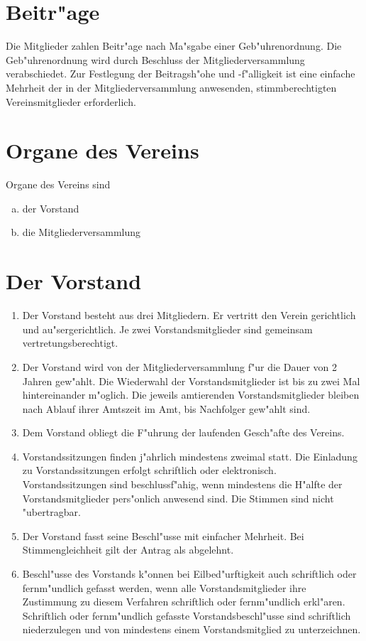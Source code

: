 \documentclass[a5paper, ngerman, 10pt]{scrreprt}
\begin{document}
\section{Beitr"age}
Die Mitglieder zahlen Beitr"age nach Ma"sgabe einer Geb"uhrenordnung. Die
Geb"uhrenordnung wird durch Beschluss der Mitgliederversammlung verabschiedet.
Zur Festlegung der Beitragsh"ohe und -f"alligkeit ist eine einfache Mehrheit der
in der Mitgliederversammlung anwesenden, stimmberechtigten Vereinsmitglieder
erforderlich.


\section{Organe des Vereins}
Organe des Vereins sind
\begin{enumerate}[a.]
    \item der Vorstand
    \item die Mitgliederversammlung
\end{enumerate}


\section{Der Vorstand}
\begin{enumerate}[(1)]
    \item Der Vorstand besteht aus drei Mitgliedern. Er vertritt den Verein
        gerichtlich und au"sergerichtlich. Je zwei Vorstandsmitglieder sind
        gemeinsam vertretungsberechtigt.
    \item Der Vorstand wird von der Mitgliederversammlung f"ur die Dauer von 2
        Jahren gew"ahlt. Die Wiederwahl der Vorstandsmitglieder ist bis zu zwei
        Mal hintereinander m"oglich. Die jeweils amtierenden Vorstandsmitglieder
        bleiben nach Ablauf ihrer Amtszeit im Amt, bis Nachfolger gew"ahlt sind.
    \item Dem Vorstand obliegt die F"uhrung der laufenden Gesch"afte des
        Vereins.
    \item Vorstandssitzungen finden j"ahrlich mindestens zweimal statt. Die
        Einladung zu Vorstandssitzungen erfolgt schriftlich oder elektronisch.
        Vorstandssitzungen sind beschlussf"ahig, wenn mindestens die H"alfte der
        Vorstandsmitglieder pers"onlich anwesend sind. Die Stimmen sind nicht
        "ubertragbar.
    \item Der Vorstand fasst seine Beschl"usse mit einfacher Mehrheit. Bei
        Stimmengleichheit gilt der Antrag als abgelehnt.
    \item Beschl"usse des Vorstands k"onnen bei Eilbed"urftigkeit auch
        schriftlich oder fernm"undlich gefasst werden, wenn alle
        Vorstandsmitglieder ihre Zustimmung zu diesem Verfahren schriftlich oder
        fernm"undlich erkl"aren.  Schriftlich oder fernm"undlich gefasste
        Vorstandsbeschl"usse sind schriftlich niederzulegen und von mindestens
        einem Vorstandsmitglied zu unterzeichnen.
\end{enumerate}
\end{document}
